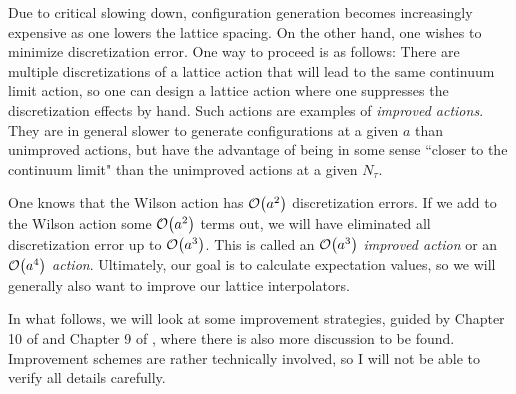Due to critical slowing down, configuration generation becomes increasingly
expensive as one lowers the lattice spacing.
On the other hand, one wishes to minimize discretization error. One way to
proceed is as follows: There are multiple discretizations of a lattice action
that will lead to the same continuum limit action, so one can design a lattice
action where one suppresses the discretization effects by hand. Such actions
are examples of {\it improved actions}. They are in general slower to generate
configurations at a given $a$ than unimproved actions, but have the advantage
of being in some sense ``closer to the continuum limit" than the unimproved
actions at a given $N_\tau$.

One knows that the Wilson action has
$\order{a^2}$ discretization errors. If we add to the Wilson action some
$\order{a^2}$ terms out, we will have eliminated all discretization error
up to $\order{a^3}$. This is called an $\order{a^3}$ {\it improved action}
or an $\order{a^4}$ {\it action}. Ultimately, our goal is to calculate
expectation values, so we will generally also want to improve our 
lattice interpolators. 

In what follows, we will look at some improvement strategies, guided by 
Chapter 10 of \cite{degrand_lattice_2006} and Chapter 9 of
\cite{gattringer_quantum_2010}, where there is also more discussion to 
be found. Improvement schemes are rather technically
involved, so I will not be able to verify all details carefully.

